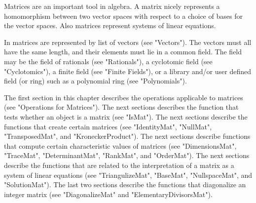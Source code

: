 %

Matrices are an  important tool in algebra.  A matrix nicely represents a
homomorphism  between two vector spaces with respect to a choice of bases
for  the  vector  spaces.   Also  matrices  represent systems  of  linear
equations.

In {\GAP}  matrices are represented by list of vectors  (see  "Vectors").
The vectors must all have the same length, and their elements must lie in
a  common  field.   The  field  may  be  the  field  of   rationals  (see
"Rationals"), a cyclotomic field (see "Cyclotomics"), a finite field (see
"Finite Fields"),  or a library and/or user  defined field (or ring) such
as a polynomial ring (see "Polynomials").

The first  section in this chapter describes the operations applicable to
matrices (see "Operations for Matrices").   The next  sections  describes
the function that tests whether an object is a matrix (see "IsMat").  The
next  sections describe the functions that create  certain  matrices (see
"IdentityMat", "NullMat", "TransposedMat",  and "KroneckerProduct").  The
next  sections  describe functions that  compute  certain  characteristic
values of matrices  (see  "DimensionsMat", "TraceMat",  "DeterminantMat",
"RankMat", and  "OrderMat").   The  next  sections describe the functions
that are related to the interpretation of a matrix  as a system of linear
equations   (see   "TriangulizeMat",   "BaseMat",   "NullspaceMat",   and
"SolutionMat").   The last  two  sections  describe  the  functions  that
diagonalize    an    integer    matrix    (see    "DiagonalizeMat"    and
"ElementaryDivisorsMat").

